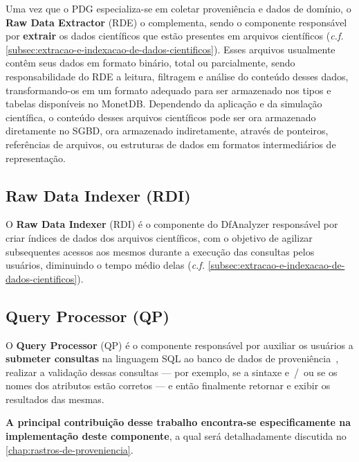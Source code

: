 Uma vez que o PDG especializa-se em coletar proveniência e dados de domínio, o \textbf{Raw Data Extractor} (RDE) o complementa, sendo o componente responsável por \textbf{extrair} os dados científicos que estão presentes em arquivos científicos (\textit{c.f.} \autoref{subsec:extracao-e-indexacao-de-dados-cientificos}). Esses arquivos usualmente contêm seus dados em formato binário, total ou parcialmente, sendo responsabilidade do RDE a leitura, filtragem e análise do conteúdo desses dados, transformando-os em um formato adequado para ser armazenado nos tipos e tabelas disponíveis no MonetDB. Dependendo da aplicação e da simulação científica, o conteúdo desses arquivos científicos pode ser ora armazenado diretamente no SGBD, ora armazenado indiretamente, através de ponteiros, referências de arquivos, ou estruturas de dados em formatos intermediários de representação.


\subsection{Raw Data Indexer (RDI)}

O \textbf{Raw Data Indexer} (RDI) é o componente do DfAnalyzer responsável por criar índices de dados dos arquivos científicos, com o objetivo de agilizar subsequentes acessos aos mesmos durante a execução das consultas pelos usuários, diminuindo o tempo médio delas (\textit{c.f.} \autoref{subsec:extracao-e-indexacao-de-dados-cientificos}).


\subsection{Query Processor (QP)}

O \textbf{Query Processor} (QP) é o componente responsável por auxiliar os usuários a \textbf{submeter consultas} na linguagem SQL ao banco de dados de proveniência~\cite{silva2016situ}, realizar a validação dessas consultas --- por exemplo, se a sintaxe e~/~ou se os nomes dos atributos estão corretos --- e então finalmente retornar e exibir os resultados das mesmas.

\textbf{A principal contribuição desse trabalho encontra-se especificamente na implementação deste componente}, a qual será detalhadamente discutida no \autoref{chap:rastros-de-proveniencia}.


